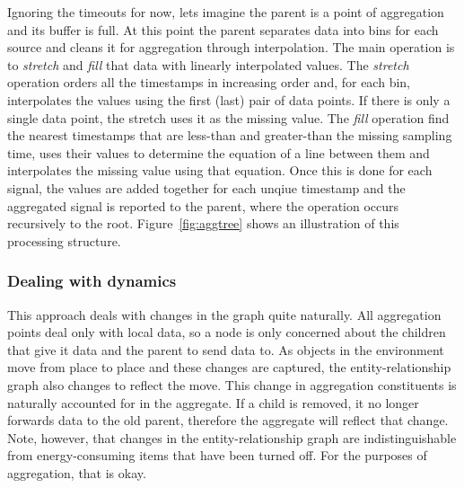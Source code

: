 Ignoring the timeouts for now, lets imagine the parent is a point of aggregation and its buffer is full.  At this point
the parent separates data into bins for each source and cleans it for aggregation through interpolation.  The main
operation is to \emph{stretch} and \emph{fill} that data with linearly interpolated values.  The \emph{stretch}
operation orders all the timestamps in increasing order and, for each bin, interpolates the values using the
first (last) pair of data points.  If there is only a single data point, the stretch uses it as the missing value.
The \emph{fill} operation find the nearest timestamps that are less-than and greater-than the missing sampling time, 
uses their values to determine the equation of a line between them and interpolates the missing value using that equation.
Once this is done for each signal, the values are added together for each unqiue timestamp and the aggregated
signal is reported to the parent, where the operation occurs recursively to the root.
Figure~\ref{fig:aggtree} shows an illustration of this processing structure.








\subsubsection{Dealing with dynamics}
\label{sec:dynagg}

This approach deals with changes in the graph quite naturally.  All aggregation points deal only with local data, so
a node is only concerned about the children that give it data and the parent to send data to.  As objects in the environment
move from place to place and these changes are captured, the entity-relationship graph also changes to reflect the move.
This change in aggregation constituents is naturally accounted for in the aggregate.  If a child is removed,
it no longer forwards data to the old parent, therefore the aggregate will reflect that change.
Note, however, that changes in the entity-relationship graph are indistinguishable from energy-consuming items that have
been turned off.  For the purposes of aggregation, that is okay.

